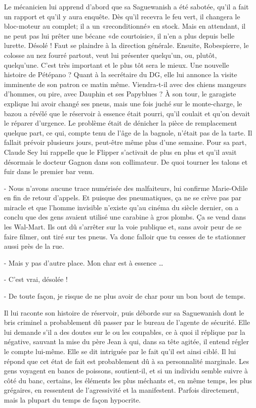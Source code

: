 Le mécanicien lui apprend d’abord que sa Saguewanish a été sabotée, qu’il a fait un rapport et qu’il y aura enquête. Dès qu’il recevra le feu vert, il changera le bloc-moteur au complet; il a un «reconditionné» en stock. Mais en attendant, il ne peut pas lui prêter une bécane «de courtoisie», il n’en a plus depuis belle lurette. Désolé ! Faut se plaindre à la direction générale. Ensuite, Robespierre, le colosse au nez fourré partout, veut lui présenter quelqu’un, ou, plutôt, quelqu’une. C’est très important et le plus tôt sera le mieux. Une nouvelle histoire de Pétépano ? Quant à la secrétaire du DG, elle lui annonce la visite imminente de son patron ce matin même. Viendra-t-il avec des chiens mangeurs d’hommes, ou pire, avec Dauphin et ses Papyblues ? À son tour, le garagiste explique lui avoir changé ses pneus, mais une fois juché sur le monte-charge, le bazou a révélé que le réservoir à essence était pourri, qu’il coulait et qu’on devait le réparer d’urgence. Le problème était de dénicher la pièce de remplacement quelque part, ce qui, compte tenu de l’âge de la bagnole, n’était pas de la tarte. Il fallait prévoir plusieurs jours, peut-être même plus d’une semaine. Pour sa part, Claude Sey lui rappelle que le Flipper s’activait de plus en plus et qu’il avait désormais le docteur Gagnon dans son collimateur. De quoi tourner les talons et fuir dans le premier bar venu.

- Nous n’avons aucune trace numérisée des malfaiteurs, lui confirme Marie-Odile en fin de retour d’appels. Et puisque des pneumatiques, ça ne se crève pas par miracle et que l’homme invisible n’existe qu’au cinéma du siècle dernier, on a conclu que des gens avaient utilisé une carabine à gros plombs. Ça se vend dans les Wal-Mart. Ils ont dû s’arrêter sur la voie publique et, sans avoir peur de se faire filmer, ont tiré sur tes pneus. Va donc falloir que tu cesses de te stationner aussi près de la rue.

- Mais y pas d’autre place. Mon char est à essence …

- C’est vrai, désolée !

- De toute façon, je risque de ne plus avoir de char pour un bon bout de temps.

Il lui raconte son histoire de réservoir, puis déborde sur sa Saguewanish dont le bris criminel a probablement dû passer par le bureau de l’agente de sécurité. Elle lui demande s’il a des doutes sur le ou les coupables, ce à quoi il réplique par la négative, sauvant la mise du père Jean à qui, dans sa tête agitée, il entend régler le compte lui-même. Elle se dit intriguée par le fait qu’il est ainsi ciblé. Il lui répond que cet état de fait est probablement dû à sa personnalité marginale. Les gens voyagent en bancs de poissons, soutient-il, et si un individu semble suivre à côté du banc, certains, les éléments les plus méchants et, en même temps, les plus grégaires, en ressentent de l’agressivité et la manifestent. Parfois directement, mais la plupart du temps de façon hypocrite.

